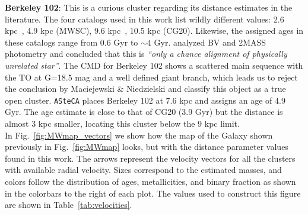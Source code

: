 \documentclass[referee]{aa}
\begin{document}
  \noindent \textbf{Berkeley 102}: This is a curious cluster regarding its distance
  estimates in the literature. The four catalogs used in this work list wildly
  different values: 2.6 kpc~\citep[WEBDA;][]{Tadross_2008}, 4.9 kpc (MWSC),
  9.6 kpc~\citep[OC02;][]{Hasegawa_2008}, 10.5 kpc (CG20). Likewise, the
  assigned ages in these catalogs range from 0.6 Gyr to $\sim4$ Gyr.
  \cite{Maciejewski_2008} analyzed BV and 2MASS photometry and concluded that
  this is \emph{``only a chance alignment of physically unrelated star''}.
  The CMD for Berkeley 102 shows a scattered main sequence with the TO at G=18.5
  mag and a well defined giant branch, which leads us to reject the conclusion
  by Maciejewski \& Niedzielski and classify this object as a true open cluster.
  \texttt{ASteCA} places Berkeley 102 at 7.6 kpc and assigns an age of 4.9 Gyr.
  The age estimate is close to that of CG20 (3.9 Gyr) but the distance is
  almost 3 kpc smaller, locating this cluster below the 9 kpc limit.\\



  In Fig.~\ref{fig:MWmap_vectors} we show how the map of the Galaxy shown
  previously in Fig.~\ref{fig:MWmap} looks, but with the distance parameter
  values found in this work. The arrows represent the velocity vectors for all
  the clusters with available radial velocity. Sizes correspond to the estimated
  masses, and colors follow the distribution of ages, metallicities, and binary
  fraction as shown in the colorbars to the right of each plot. The values used
  to construct this figure are shown in Table~\ref{tab:velocities}.
 
\end{document}
